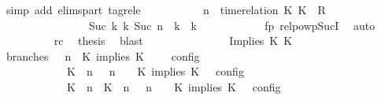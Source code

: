\begin{isabellebody}
\ {\isacharparenleft}simp\ add{\isacharcolon}\ elims{\isacharunderscore}part\ tagrel{\isacharunderscore}e{\isacharparenright}\isanewline
\ \ \ \ \ \ \ \ \isamarkupfalse%
\ {\isacartoucheopen}{\isacharparenleft}{\isasymGamma}{\isacharcomma}\ n\ {\isasymturnstile}\ {\isacharparenleft}time{\isacharminus}relation\ {\isasymlfloor}K\ K\ {\isasymin}\ R{\isacharparenright}\ {\isacharhash}\ {\isasymPsi}\ {\isasymtriangleright}\ {\isasymPhi}{\isacharparenright}\isanewline
\ \ \ \ \ \ \ \ \ \ \ \ \ \ \ \ {\isasymhookrightarrow}\isactrlbsup Suc\ k\isactrlesup \ {\isacharparenleft}{\isasymGamma}\isactrlsub k{\isacharcomma}\ Suc\ n\ {\isasymturnstile}\ {\isasymPsi}\isactrlsub k\ {\isasymtriangleright}\ {\isasymPhi}\isactrlsub k{\isacharparenright}{\isacartoucheclose}\isanewline
\ \ \ \ \ \ \ \ \ \ \isamarkupfalse%
\ fp\ relpowp{\isacharunderscore}Suc{\isacharunderscore}I{}\ \isamarkupfalse%
\ auto\isanewline
\ \ \ \ \ \ \ \ \isamarkupfalse%
\ rc\ \isamarkupfalse%
\ {\isacharquery}thesis\ \isamarkupfalse%
\ blast\isanewline
\ \ \ \ \ \ \isamarkupfalse%
\isanewline
\ \ \isamarkupfalse%
\isanewline
\ \ \ \ \isamarkupfalse%
\ {\isacharparenleft}Implies\ K\ K\isanewline
\ \ \ \ \ \ \isamarkupfalse%
\ branches{\isacharcolon}\ {\isacartoucheopen}{\isasymlbrakk}\ {\isasymGamma}{\isacharcomma}\ n\ {\isasymturnstile}\ {\isacharparenleft}{\isacharparenleft}K\ implies\ K\ {\isacharhash}\ {\isasymPsi}{\isacharparenright}\ {\isasymtriangleright}\ {\isasymPhi}\ {\isasymrbrakk}\isactrlsub c\isactrlsub o\isactrlsub n\isactrlsub f\isactrlsub i\isactrlsub g\isanewline
\ \ \ \ \ \ \ \ \ \ {\isacharequal}\ {\isasymlbrakk}\ {\isacharparenleft}{\isacharparenleft}K\ {\isasymnot}{\isasymUp}\ n{\isacharparenright}\ {\isacharhash}\ {\isasymGamma}{\isacharparenright}{\isacharcomma}\ n\ {\isasymturnstile}\ {\isasymPsi}\ {\isasymtriangleright}\ {\isacharparenleft}{\isacharparenleft}K\ implies\ K\ {\isacharhash}\ {\isasymPhi}{\isacharparenright}\ {\isasymrbrakk}\isactrlsub c\isactrlsub o\isactrlsub n\isactrlsub f\isactrlsub i\isactrlsub g\isanewline
\ \ \ \ \ \ \ \ \ \ {\isasymunion}\ {\isasymlbrakk}\ {\isacharparenleft}{\isacharparenleft}K\ {\isasymUp}\ n{\isacharparenright}\ {\isacharhash}\ {\isacharparenleft}K\ {\isasymUp}\ n{\isacharparenright}\ {\isacharhash}\ {\isasymGamma}{\isacharparenright}{\isacharcomma}\ n\ {\isasymturnstile}\ {\isasymPsi}\ {\isasymtriangleright}\ {\isacharparenleft}{\isacharparenleft}K\ implies\ K\ {\isacharhash}\ {\isasymPhi}{\isacharparenright}\ {\isasymrbrakk}\isactrlsub c\isactrlsub o\isactrlsub n\isactrlsub f\isactrlsub i\isactrlsub g{\isacartoucheclose}\isanewline

\end{isabellebody}

